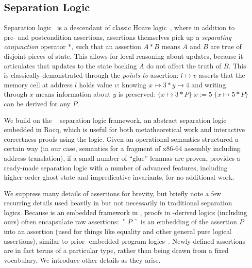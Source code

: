 \subsection{Separation Logic}
\label{sec:seplogic}
Separation logic~\cite{reynolds02} is a descendant of classic Hoare logic~\cite{hoare69},
where in addition to pre- and postcondition assertions, assertions themselves pick up a
\emph{separating conjunction} operator $\ast$, such that an assertion $A\ast B$ means $A$ and $B$ are true
of disjoint pieces of state. This allows for local reasoning about updates, because it articulates
that updates to the state backing $A$ do not affect the truth of $B$. This is classically demonstrated
through the \emph{points-to} assertion: $l\mapsto v$ asserts that the memory cell at address $l$ holds value $v$:
knowing $x\mapsto 3\ast y\mapsto 4$ and writing through $x$ means information about $y$ is preserved:
$\{x\mapsto 3\ast P\}\;x\mathrel{:=}5\;\{x\mapsto 5 \ast P\}$ can be derived for any $P$.

We build on the \iris~\cite{jung2018iris} separation logic framework,
an abstract separation logic embedded in Rocq, which is useful for both metatheoretical work
and interactive correctness proofs using the logic. Given an operational
semantics structured a certain way (in our case, semantics for
a fragment of x86-64 assembly including address translation),
if a small number of ``glue'' lemmas are proven, \iris
provides a ready-made separation logic with a number of advanced features, including
higher-order ghost state and impredicative invariants, for no additional work.

We suppress many details of \iris assertions for brevity, but briefly note
a few recurring details used heavily in \iris but not necessarily in traditional
separation logics.
Because \iris is an embedded framework in \rocq, proofs in \iris-derived
logics (including ours) often encapsulate raw \rocq assertions: $\ulcorner P \urcorner$ is an embedding
of the \rocq assertion $P$ into an \iris assertion (used for things like equality and other
general pure logical assertions), similar to prior \rocq-embedded program logics~\cite{Chlipala2013Bedrock}. Newly-defined \iris assertions are in fact
\rocq terms of a particular type, rather than being drawn from a fixed vocabulary.
We introduce other details as they arise.

